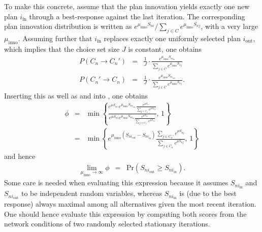 To make this concrete, assume that the plan innovation yields exactly
one new plan $i_{\text{in}}$ through a best-response against the
last iteration. The corresponding plan innovation distribution is
written as $e^{\mu_{\text{inno}}S_{ni}}/\sum_{j\in C}e^{\mu_{\text{inno}}S_{nj}}$,
with a very large $\mu_{\text{inno}}$. Assuming further that $i_{\text{in}}$
replaces exactly one uniformly selected plan $i_{\text{out}}$, which
implies that the choice set size $J$ is constant, one obtains
\begin{eqnarray}
P(C_{n}\rightarrow C_{n}') & = & \frac{1}{J}\cdot\frac{e^{\mu_{\text{inno}}S_{ni_{\text{in}}}}}{\sum_{j\in C}e^{\mu_{\text{inno}}S_{nj}}}\\
P(C_{n}'\rightarrow C_{n}) & = & \frac{1}{J}\cdot\frac{e^{\mu_{\text{inno}}S_{ni_{\text{out}}}}}{\sum_{j\in C}e^{\mu_{\text{inno}}S_{nj}}}.
\end{eqnarray}
Inserting this as well as  and 
into , one obtains
\begin{eqnarray}
\phi & = & \min\left\{ \frac{{\displaystyle e^{\mu S_{ni'}}e^{\mu_{\text{inno}}S_{ni_{\text{out}}}}\frac{e^{\mu S_{ni}}}{\sum_{j\in C_{n}}e^{\mu S_{nj}}}}}{{\displaystyle e^{\mu S_{ni}}e^{\mu_{\text{inno}}S_{ni_{\text{in}}}}\frac{e^{\mu S_{ni'}}}{\sum_{j\in C_{n}'}e^{\mu S_{nj}}}}},\,1\right\} \\
 & = & \min\left\{ {\displaystyle e^{\mu_{\text{inno}}(S_{ni_{\text{out}}}-S_{ni_{\text{in}}})}}\frac{\sum_{j\in C_{n}'}e^{\mu S_{nj}}}{\sum_{j\in C_{n}}e^{\mu S_{nj}}},\,1\right\} 
\end{eqnarray}
and hence
\begin{eqnarray}
\lim_{\mu_{\text{inno}}\rightarrow\infty}\phi & = & \text{Pr}(S_{ni_{\text{out}}}\geq S_{ni_{\text{in}}}).
\end{eqnarray}
Some care is needed when evaluating this expression because it assumes
$S_{ni_{\text{in}}}$ and $S_{ni_{\text{out}}}$ to be independent
random variables, whereas $S_{ni_{\text{in}}}$ is (due to the best
response) always maximal among all alternatives given the most recent
iteration. One should hence evaluate this expression by computing
both scores from the network conditions of two randomly selected stationary
iterations.


